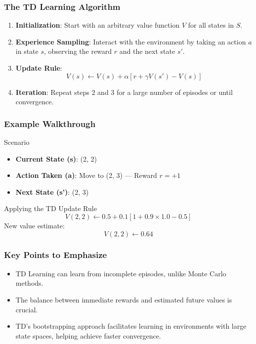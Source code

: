 \documentclass[aspectratio=169]{beamer}
\begin{document}
\begin{frame}[fragile]
    \frametitle{The TD Learning Algorithm}
    \begin{enumerate}
        \item \textbf{Initialization}: Start with an arbitrary value function \( V \) for all states in \( S \).
        \item \textbf{Experience Sampling}: Interact with the environment by taking an action \( a \) in state \( s \), observing the reward \( r \) and the next state \( s' \).
        \item \textbf{Update Rule}:
        \begin{equation}
            V(s) \leftarrow V(s) + \alpha \left[ r + \gamma V(s') - V(s) \right]
        \end{equation}
        \item \textbf{Iteration}: Repeat steps 2 and 3 for a large number of episodes or until convergence.
    \end{enumerate}
\end{frame}

\begin{frame}[fragile]
    \frametitle{Example Walkthrough}
    \begin{block}{Scenario}
        \begin{itemize}
            \item \textbf{Current State (s)}: (2, 2)
            \item \textbf{Action Taken (a)}: Move to (2, 3) — Reward \( r = +1 \)
            \item \textbf{Next State (s')}: (2, 3)
        \end{itemize}
    \end{block}
    \begin{block}{Applying the TD Update Rule}
        \begin{equation}
            V(2, 2) \leftarrow 0.5 + 0.1 \left[ 1 + 0.9 \times 1.0 - 0.5 \right]
        \end{equation}
        New value estimate:
        \begin{equation}
            V(2, 2) \leftarrow 0.64
        \end{equation}
    \end{block}
\end{frame}

\begin{frame}[fragile]
    \frametitle{Key Points to Emphasize}
    \begin{itemize}
        \item TD Learning can learn from incomplete episodes, unlike Monte Carlo methods.
        \item The balance between immediate rewards and estimated future values is crucial.
        \item TD's bootstrapping approach facilitates learning in environments with large state spaces, helping achieve faster convergence.
    \end{itemize}
\end{frame}
\end{document}
